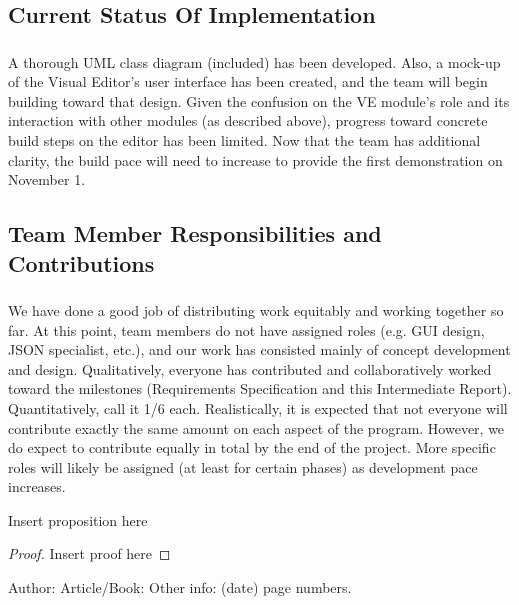 \documentclass{llncs}
\begin{document}
\subsection{Current Status Of Implementation}
\subsubsection{}
A thorough UML class diagram (included) has been developed.  Also, a mock-up of the Visual Editor’s user interface has been created, and the team will begin building toward that design. Given the confusion on the VE module’s role and its interaction with other modules (as described above), progress toward concrete build steps on the editor has been limited.  Now that the team has additional clarity, the build pace will need to increase to provide the first demonstration on November 1.  

\subsection{Team Member Responsibilities and Contributions}
\subsubsection{}We have done a good job of distributing work equitably and working together so far.  At this point, team members do not have assigned roles (e.g. GUI design, JSON specialist, etc.), and our work has consisted mainly of concept development and design.  Qualitatively, everyone has contributed and collaboratively worked toward the milestones (Requirements Specification and this Intermediate Report).  Quantitatively, call it 1/6 each.  Realistically, it is expected that not everyone will contribute exactly the same amount on each aspect of the program.  However, we do expect to contribute equally in total by the end of the project.  More specific roles will likely be assigned (at least for certain phases) as development pace increases.





\begin{proposition}
Insert proposition here
\end{proposition}

\begin{proof}
Insert proof here
\end{proof}



%
%

\begin{thebibliography}{1}
Author:
Article/Book:
Other info: (date) page numbers.
\end{thebibliography}
\end{document}
